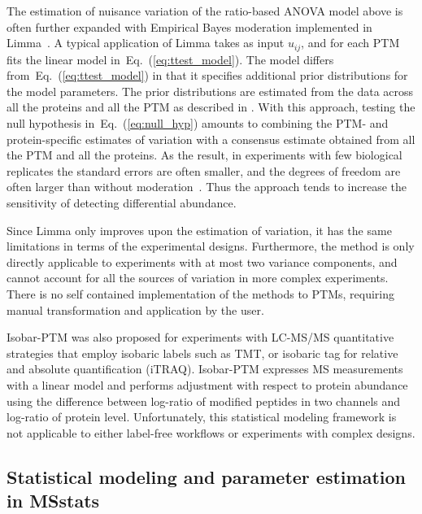\documentclass[mcp]{article}
\numberwithin{table}{section}
\def\eqref#1{Eq.~(\ref{eq:#1})}
\begin{document}
\medskip \noindent The estimation of nuisance variation of the ratio-based ANOVA model above is often further expanded with Empirical Bayes moderation implemented in Limma~\cite{ Ritchie_15a, Schwammle2015, Smyth:2004, Smyth:2005, Zhu,Chappell:2021}. A typical application of Limma takes as input $u_{ij}$, and for each PTM fits the linear model in~\eqref{ttest_model}. 
The model differs from~\eqref{ttest_model} in that it specifies additional prior distributions for the model parameters.
The prior distributions are estimated from the data across all the proteins and all the PTM as described in \cite{Smyth:2004}. 
With this approach, testing the null hypothesis in~\eqref{null_hyp} amounts to combining the PTM- and protein-specific estimates of variation with a consensus estimate obtained from all the PTM and all the proteins.
As the result, in experiments with few biological replicates the standard errors are often smaller, and the degrees of freedom are often larger than without moderation~\cite{Ritchie_15a}. 
Thus the approach tends to increase the sensitivity of detecting differential abundance.

Since Limma only improves upon the estimation of variation, it has the same limitations in terms of the experimental designs. Furthermore, the method is only directly applicable to experiments with at most two variance components, and cannot account for all the sources of variation in more complex experiments. There is no self contained implementation of the methods to PTMs, requiring manual transformation and application by the user.

\medskip {} 

\medskip \noindent Isobar-PTM was also proposed for experiments with LC-MS/MS quantitative strategies that employ isobaric labels such as TMT, or isobaric tag for relative and absolute quantification (iTRAQ)\cite{Breitwieser:2013}. Isobar-PTM expresses MS measurements with a linear model and performs adjustment with respect to protein abundance using the difference between log-ratio of modified peptides in two channels and log-ratio of protein level. Unfortunately, this statistical modeling framework is not applicable to either label-free workflows or experiments with complex designs. 


\subsection*{Statistical modeling and parameter estimation in MSstats}
\end{document}
